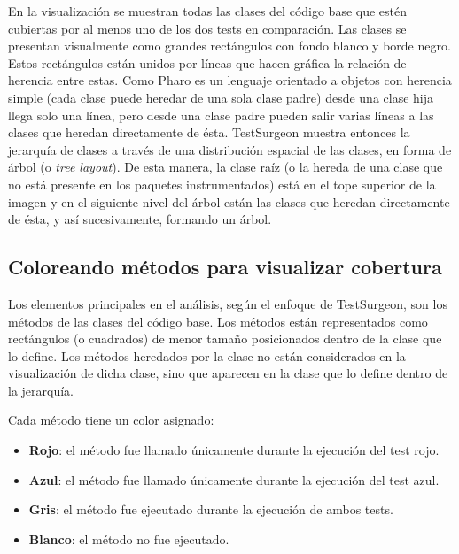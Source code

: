 \par En la visualización se muestran todas las clases del código base que estén cubiertas por al menos uno de los dos tests en comparación. Las clases se presentan visualmente como grandes rectángulos con fondo blanco y borde negro. Estos rectángulos están unidos por líneas que hacen gráfica la relación de herencia entre estas. Como Pharo es un lenguaje orientado a objetos con herencia simple (cada clase puede heredar de una sola clase padre) desde una clase hija llega solo una línea, pero desde una clase padre pueden salir varias líneas a las clases que heredan directamente de ésta. TestSurgeon muestra entonces la jerarquía de clases a través de una distribución espacial de las clases, en forma de árbol (o \emph{tree layout}). De esta manera, la clase raíz (o la hereda de una clase que no está presente en los paquetes instrumentados) está en el tope superior de la imagen y en el siguiente nivel del árbol están las clases que heredan directamente de ésta, y así sucesivamente, formando un árbol.


\subsection{Coloreando métodos para visualizar cobertura}

\par Los elementos principales en el análisis, según el enfoque de TestSurgeon, son los métodos de las clases del código base. Los métodos están representados como rectángulos (o cuadrados) de menor tamaño posicionados dentro de la clase que lo define.  Los métodos heredados por la clase no están considerados en la visualización de dicha clase, sino que aparecen en la clase que lo define dentro de la jerarquía.  

\par Cada método tiene un color asignado:
\begin{itemize}
\item {\bf Rojo}: el método fue llamado únicamente durante la ejecución del test rojo.
\item {\bf Azul}: el método fue llamado únicamente durante la ejecución del test azul.
\item {\bf Gris}: el método fue ejecutado durante la ejecución de ambos tests.
\item {\bf Blanco}: el método no fue ejecutado.
\end{itemize}

